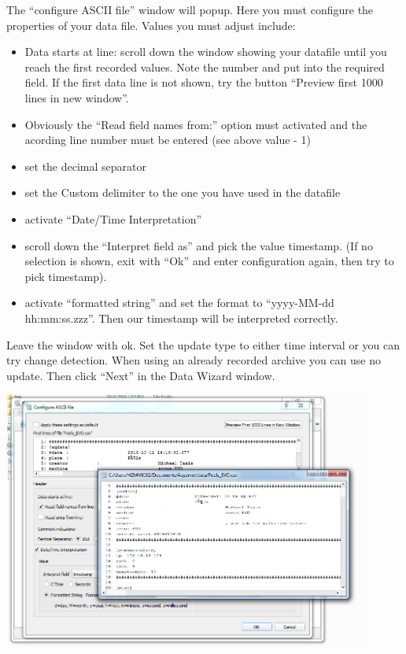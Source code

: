 \documentclass[a4paper,10pt,english]{sphinxmanual}
\begin{document}
The ``configure ASCII file'' window will popup. Here you must configure the properties of your data file. Values you must adjust include:
\begin{itemize}
\item {} 
Data starts at line: scroll down the window showing your datafile until you reach the first recorded values. Note the number and put into the required field. If the first data line is not shown, try the button ``Preview first 1000 lines in new window''.

\item {} 
Obviously the ``Read field names from:'' option must activated and the acording line number must be entered (see above value - 1)

\item {} 
set the decimal separator

\item {} 
set the Custom delimiter to the one you have used in the datafile

\item {} 
activate ``Date/Time Interpretation''

\item {} 
scroll down the ``Interpret field as'' and pick the value timestamp. (If no selection is shown, exit with ``Ok'' and enter configuration again, then try to pick timestamp).

\item {} 
activate ``formatted string'' and set the format to ``yyyy-MM-dd hh:mm:ss.zzz''. Then our timestamp will be interpreted correctly.

\end{itemize}

Leave the window with ok. Set the update type to either time interval or you can try change detection. When using an already recorded archive you can use no update. Then click ``Next'' in the Data Wizard window.

{\hfill\includegraphics[width=12cm]{wiz3.png}\hfill}
\end{document}
